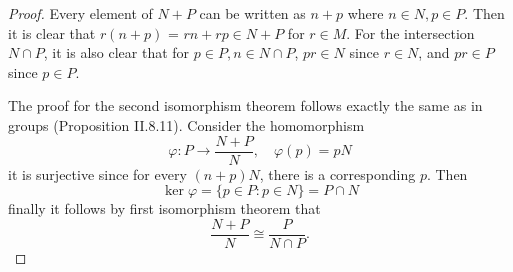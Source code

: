 \begin{proof}
Every element of $N+P$ can be written as $n+p$ where $n \in N, p \in P$. Then it is clear that $r(n+p)$ = $rn + rp \in N+P$ for $r \in M$. For the intersection $N \cap P$, it is also clear that for $p \in P, n \in N \cap P$, $pr \in N$ since $r \in N$, and $pr \in P$ since $p \in P$.

The proof for the second isomorphism theorem follows exactly the same as in groups (Proposition II.8.11). Consider the homomorphism
\[
\varphi: P \to \frac{N+P}{N}, \quad \varphi(p) = pN
\]
it is surjective since for every $(n+p)N$, there is a corresponding $p$. Then
\[
\ker \varphi = \{p \in P : p \in N\} = P \cap N
\]
finally it follows by first isomorphism theorem that
\[
\frac{N+P}{N} \cong \frac{P}{N \cap P}.
\]
\end{proof}

\section{}

